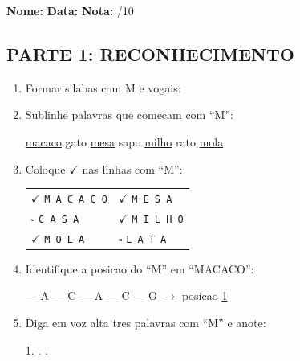 \begin{exercicio}
\noindent\textbf{Nome:} \underline{\hspace{3.2cm}} \quad \textbf{Data:} \underline{\hspace{1.6cm}} \quad \textbf{Nota:} \underline{\hspace{0.9cm}}/10

\subsection*{PARTE 1: RECONHECIMENTO}

\begin{enumerate}
  \item Formar silabas com M e vogais:
  \begin{center}
   \quad {} \quad {} \quad {} \quad {}
  \end{center}

  \item Sublinhe palavras que comecam com ``M'':
  \begin{center}
  \uline{macaco} \quad gato \quad \uline{mesa} \quad sapo \quad \uline{milho} \quad rato \quad \uline{mola}
  \end{center}

  \item Coloque $\checkmark$ nas linhas com ``M'':
  \begin{center}
  \begin{tabular}{ll}
  $\checkmark$ \texttt{M A C A C O} & $\checkmark$ \texttt{M E S A} \\
  $\square$ \texttt{C A S A} & $\checkmark$ \texttt{M I L H O} \\
  $\checkmark$ \texttt{M O L A} & $\square$ \texttt{L A T A}
  \end{tabular}
  \end{center}

  \item Identifique a posicao do ``M'' em ``MACACO'':
  \begin{center}
   --- A --- C --- A --- C --- O $\rightarrow$ posicao \underline{1}
  \end{center}

  \item Diga em voz alta tres palavras com ``M'' e anote:
  \begin{center}
  1. \underline{\hspace{4cm}} . \underline{\hspace{4cm}} . \underline{\hspace{4cm}}
  \end{center}
\end{enumerate}


\end{exercicio}
